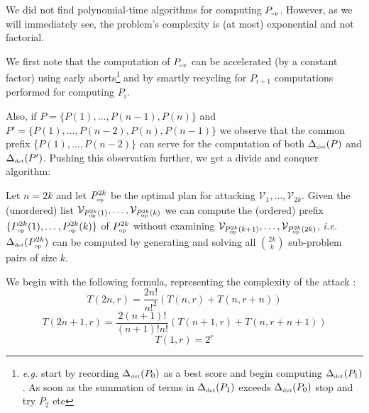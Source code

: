 \documentclass[11pt]{llncs}
\begin{document}


We did not find polynomial-time algorithms for computing $P_{\mbox{{\tiny op}}}$. However, as we will immediately see, the problem's complexity is (at most) exponential and not factorial.\smallskip

We first note that the computation of $P_{\mbox{{\tiny op}}}$ can be accelerated (by a constant factor) using early aborts\footnote{{\sl e.g.} start by recording $\Delta_{\mbox{{\tiny det}}}(P_0)$ as a best score and begin computing $\Delta_{\mbox{{\tiny det}}}(P_1)$. As soon as the summation of terms in $\Delta_{\mbox{{\tiny det}}}(P_1)$ exceeds $\Delta_{\mbox{{\tiny det}}}(P_0)$ stop and try $P_2$ etc} and by smartly recycling for $P_{i+1}$ computations performed for computing $P_i$.\smallskip

Also, if $P=\{P(1),\ldots,P(n-1),P(n)\}$ and $P'=\{P(1),\ldots,P(n-2),P(n),P(n-1)\}$ we observe that the common prefix $\{P(1),\ldots,P(n-2)\}$ can serve for the computation of both $\Delta_{\mbox{{\tiny det}}}(P)$ and $\Delta_{\mbox{{\tiny det}}}(P')$. Pushing this observation further, we get a divide and conquer algorithm: \smallskip

Let $n=2k$ and let $P_{\mbox{{\tiny op}}}^{2k}$ be the optimal plan for attacking $\mathcal{V}_1,\ldots,\mathcal{V}_{2k}$. Given the (unordered) list $\mathcal{V}_{P_{\mbox{{\tiny op}}}^{2k}(1)},\ldots,\mathcal{V}_{P_{\mbox{{\tiny op}}}^{2k}(k)}$ we can compute the (ordered) prefix $\{P_{\mbox{{\tiny op}}}^{2k}(1),\ldots,P_{\mbox{{\tiny op}}}^{2k}(k)\}$ of $P_{\mbox{{\tiny op}}}^{2k}$ without examining $\mathcal{V}_{P_{\mbox{{\tiny op}}}^{2k}(k+1)},\ldots,\mathcal{V}_{P_{\mbox{{\tiny op}}}^{2k}(2k)}$, {\sl i.e.} $\Delta_{\mbox{{\tiny det}}}(P_{\mbox{{\tiny op}}}^{2k})$ can be computed by generating and solving all $\binom{2k}{k}$ sub-problem pairs of size $k$.\smallskip

We begin with the following formula, representing the complexity of the attack :
\[
	T(2n, r) = \frac{2n!}{n!^2}(T(n, r)+T(n, r+n))
\]
\[
	T(2n+1, r) = \frac{2(n+1)!}{(n+1)!n!}(T(n+1, r)+T(n, r+n+1))
\]
\[
	T(1, r) = 2^r
\]
\end{document}
